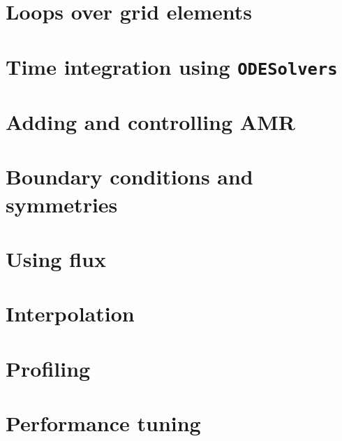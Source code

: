 \section{Loops over grid elements}
\label{sec:loops}


\section{Time integration using \texttt{ODESolvers}}
\label{sec:odesolvers}


\section{Adding and controlling AMR}
\label{sec:amr}


\section{Boundary conditions and symmetries}
\label{sec:bcs}


\section{Using flux}
\label{sec:flux}

\section{Interpolation}
\label{sec:interpolation}

\section{Profiling}
\label{sec:profiling}

\section{Performance tuning}
\label{sec:perf_tuning}


